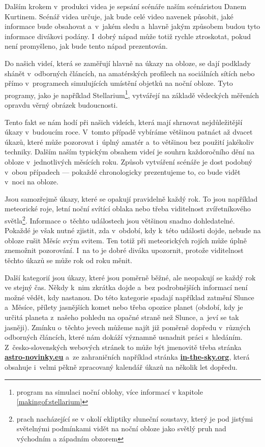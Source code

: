 \documentclass[12pt,a4paper,titlepage]{article}
\newcommand{\link}[2]{\href{#1}{\textcolor{link-color}{\textbf{#2}}}}%
\begin{document}
Dalším krokem v~produkci videa je sepsání scénáře naším scénáristou Danem Kurtinem. Scénář videa určuje, jak bude celé video navenek působit, jaké informace bude obsahovat a~v~jakém sledu a~hlavně jakým způsobem budou tyto informace divákovi podány. I~dobrý nápad může totiž rychle ztroskotat, pokud není promyšleno, jak bude tento nápad prezentován.

Do našich videí, která se zaměřují hlavně na úkazy na obloze, se dají podklady shánět v~odborných článcích, na amatérských profilech na sociálních sítích nebo přímo v~programech simulujících umístění objetků na noční obloze. Tyto programy, jako je například Stellarium\footnote{program na simulaci noční oblohy, více informací v kapitole \ref{makingof:stellarium}}, vytvářejí na základě vědeckých měřeních opravdu věrný obrázek budoucnosti. 

Tento fakt se nám hodí při našich videích, která mají shrnovat nejdůležitější úkazy v~budoucím roce. V~tomto případě vybíráme většinou patnáct až dvacet úkazů, které může pozorovat i~úplný amatér a~to většinou bez použití jakékoliv techniky. Dalším naším typickým obsahem videí je souhrn každoročního dění na obloze v~jednotlivých měsících roku. Způsob vytváření scénáře je dost podobný v~obou případech --- pokaždé chronologicky prezentujeme to, co bude vidět v~noci na obloze.

Jsou samozřejmě úkazy, které se opakují pravidelně každý rok. To jsou například meteorické roje, letní noční svítící oblaka nebo třeba viditelnost zvířetníkového světla\footnote{prach nacházející se v okolí ekliptiky sluneční soustavy, který je pod jistými světelnými podmínkami vidět na noční obloze jako světlý pruh nad východním a západním obzorem}. Informace o~těchto událostech jsou většinou snadno dohledatelné. Pokaždé je však nutné zjistit, zda v~období, kdy k~této události dojde, nebude na obloze rušit Měsíc svým svitem. Ten totiž při meteorických rojích může úplně znemožnit pozorování. I~na to je dobré diváka upozornit, protože viditelnost těchto úkazů se může rok od roku měnit.

Další kategorií jsou úkazy, které jsou poměrně běžné, ale neopakují se každý rok ve stejný čas. Někdy k~nim zkrátka dojde a~bez podrobnějších informací není možné vědět, kdy nastanou. Do této kategorie spadají například zatmění Slunce a~Měsíce, přílety jasnějších komet nebo třeba opozice planet (období, kdy je určitá planeta z~našeho pohledu na opačné straně než Slunce, a~jeví se tak jasněji). Zmínku o~těchto jevech můžeme najít již poměrně dopředu v~různých odborných článcích, které nám dokáží významně usnadnit práci s~hledáním. Z~česko-slovenských webových stránek to může být jmenovitě třeba stránka \link{https://www.astro-novinky.eu}{astro-novinky.eu} a~ze zahraničních například stránka \link{https://in-the-sky.org}{in-the-sky.org}, která obsahuje i~velmi pěkně zpracovaný kalendář úkazů na několik let dopředu.
\end{document}
